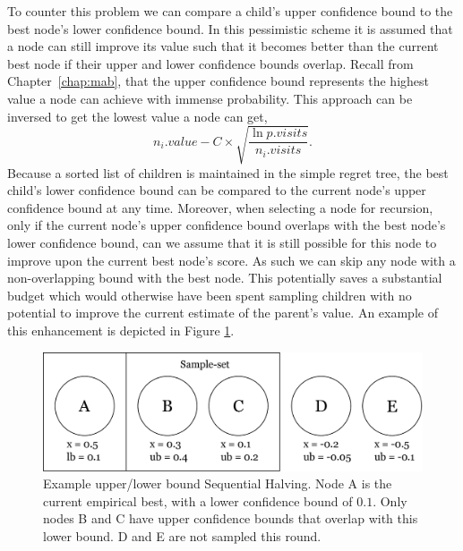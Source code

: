 \documentclass{kecsmstr}
\begin{document}
To counter this problem we can compare a child's upper confidence bound to the best node's lower confidence bound. In this pessimistic scheme it is assumed that a node can still improve its value such that it becomes better than the current best node if their upper and lower confidence bounds overlap. Recall from Chapter~\ref{chap:mab}, that the upper confidence bound represents the highest value a node can achieve with immense probability. This approach can be inversed to get the lowest value a node can get,
\begin{equation}
 n_i.value - C \times \displaystyle\sqrt{\frac{\ln{p.visits}}{n_i.visits}}.
\end{equation}
Because a sorted list of children is maintained in the simple regret tree, the best child's lower confidence bound can be compared to the current node's upper confidence bound at any time. Moreover, when selecting a node for recursion, only if the current node's upper confidence bound overlaps with the best node's lower confidence bound, can we assume that it is still possible for this node to improve upon the current best node's score. As such we can skip any node with a non-overlapping bound with the best node. This potentially saves a substantial budget which would otherwise have been spent sampling children with no potential to improve the current estimate of the parent's value. An example of this enhancement is depicted in Figure \ref{fig:ublb}.

\begin{figure}[ht]
	\centering
	\includegraphics[width=.7\textwidth]{img/ublb.png}
	\caption{Example upper/lower bound Sequential Halving. Node A is the current empirical best, with a lower confidence bound of $0.1$. Only nodes B and C have upper confidence bounds that overlap with this lower bound. D and E are not sampled this round.}
	\label{fig:ublb}
\end{figure}
\end{document}
